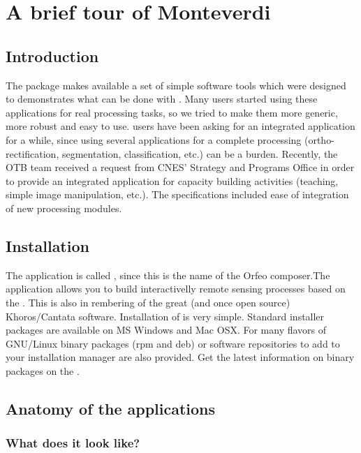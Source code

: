 \chapter{A brief tour of Monteverdi}\label{chap:Monteverdi} 

\section{Introduction}\label{sec:montintro}
The \app package makes available a set of simple software
tools which were designed to demonstrates what can be done with
\otb. Many users started using these applications for real processing
tasks, so we tried to make them more generic, more robust and easy to
use. \otb users have been asking for an integrated application for a
while, since using several applications for a complete processing
(ortho-rectification, segmentation, classification, etc.) can be a
burden. Recently, the OTB team received a request from CNES' Strategy
and Programs Office in order to provide an integrated application for
capacity building activities (teaching, simple image manipulation,
etc.). The specifications included ease of integration of new
processing modules.  

\section{Installation}\label{sec:montinstall} 
The application is called \mont, since this is the name of the Orfeo
composer.The application allows you to build interactivelly remote
sensing processes based on the \otb. This is also in
rembering of the great (and once open source) Khoros/Cantata
software.  Installation of \mont is very simple. Standard
installer packages are available on MS Windows and Mac OSX.  For many
flavors of GNU/Linux binary packages (rpm and deb) or software
repositories to add to your installation manager are also provided. 
Get the latest information on binary packages on the \website.

\section{Anatomy of the applications}\label{sec:anatomy}

\subsection{What does it look like?}

